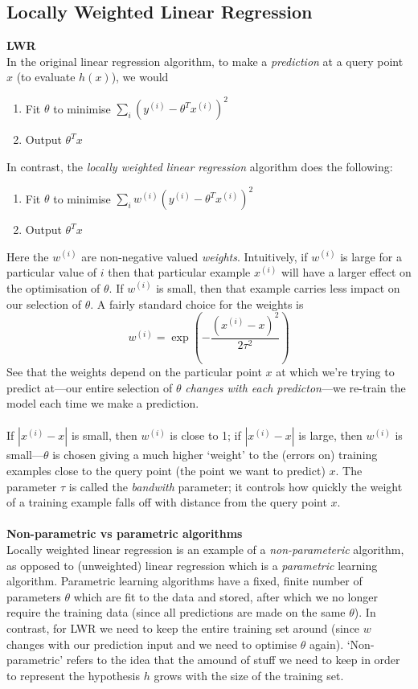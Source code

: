 \documentclass{report}
\begin{document}
\subsection{Locally Weighted Linear Regression}
\textbf{LWR}\\
In the original linear regression algorithm, to make a 
\textit{prediction} at a query point $x$ (to evaluate $h(x)$), we would
\begin{enumerate}
\item Fit $\theta$ to minimise $\sum_i(y^{(i)}-\theta^Tx^{(i)})^2$
\item Output $\theta^Tx$
\end{enumerate}
In contrast, the \textit{locally weighted linear regression} algorithm does the following:
\begin{enumerate}
\item Fit $\theta$ to minimise $\sum_iw^{(i)}(y^{(i)}-\theta^Tx^{(i)})^2$
\item Output $\theta^Tx$
\end{enumerate}
Here the $w^{(i)}$ are non-negative valued \textit{weights}. Intuitively, if $w^{(i)}$ is large for a
particular value of $i$ then that particular example $x^{(i)}$ will have a larger effect on 
the optimisation of $\theta$. If $w^{(i)}$ is small, then that example carries less impact on our selection
of $\theta$. A fairly standard choice for the weights is
\begin{equation*}
w^{(i)}=\exp\left(-\frac{(x^{(i)}-x)^2}{2\tau^2}\right)
\end{equation*}
See that the weights depend on the particular point $x$ at which we're trying to predict at---our entire selection
of $\theta$ \textit{changes with each predicton}---we re-train the model each time we make a prediction.\\
\vspace{1mm}\\
If $|x^{(i)}-x|$ is small, then $w^{(i)}$ is close to 1; if $|x^{(i)}-x|$ is large, then $w^{(i)}$ is 
small---$\theta$ is chosen giving a much higher `weight' to the (errors on) training examples close to the
query point (the point we want to predict) $x$. The parameter $\tau$ is called the \textit{bandwith} parameter;
it controls how quickly the weight of a training example falls off with distance from the query point $x$.\\
\vspace{1mm}\\
\textbf{Non-parametric vs parametric algorithms}\\
Locally weighted linear regression is an example of a \textit{non-parameteric} algorithm, as opposed to
(unweighted) linear regression which is a \textit{parametric} learning algorithm. Parametric learning algorithms
have a fixed, finite number of parameters $\theta$ which
are fit to the data and stored, after which we no longer require the training data (since all 
predictions are made on the same $\theta$). In contrast, for LWR we need to keep the entire training set 
around (since $w$ changes with our prediction input and we need to optimise $\theta$ again). `Non-parametric' refers
to the idea that the amound of stuff we need to keep in order to represent the hypothesis $h$ grows with the size
of the training set.
\newpage
\end{document}
